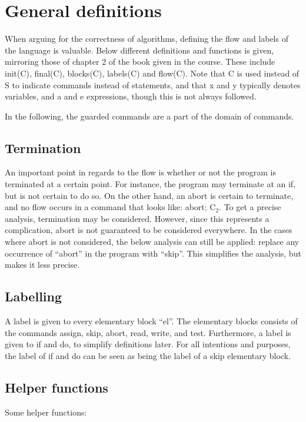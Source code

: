 \section{General definitions}
When arguing for the correctness of algorithms, defining the flow and labels of the language is
valuable. Below different definitions and functions is given, mirroring those of chapter 2 of the
book given in the course. These include init(C), final(C), blocks(C), labels(C) and flow(C).
Note that C is used instead of S to indicate commands instead of statements, and that
x and y typically denotes variables, and a and e expressions, though this is not always followed.

In the following, the guarded commands are a part of the domain of commands.

\subsection{Termination}
An important point in regards to the flow is whether or not the program is terminated
at a certain point. For instance, the program may terminate at an if, but is not
certain to do so. On the other hand, an abort is certain to terminate, and no flow
occurs in a command that looks like: abort; C$_2$. To get a precise analysis, termination
may be considered. However, since this represents a complication, abort is not guaranteed
to be considered everywhere. In the cases where abort is not considered, the below analysis
can still be applied: replace any occurrence of ``abort'' in the program with ``skip''.
This simplifies the analysis, but makes it less precise.

\subsection{Labelling}

A label is given to every elementary block ``el''. The elementary blocks consists of
the commands assign, skip, abort, read, write, and test. Furthermore, a label is given
to if and do, to simplify definitions later. For all intentions and purposes, the
label of if and do can be seen as being the label of a skip elementary block.

\subsection{Helper functions}

\docpar
Some helper functions:

